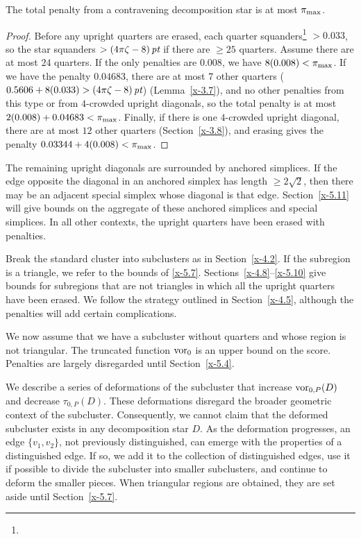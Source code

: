 \begin{lemma}
The total penalty from a contravening decomposition star is at
most $\pi_{\max}$.
\end{lemma}

\begin{proof}
Before any upright quarters are erased, each quarter
squanders\footnote{} %
$>0.033$, so the star squanders $>(4\pi\zeta-8)\,\hbox{\it pt}$ if there
are $\ge25$ quarters.  Assume there are at most $24$ quarters. If
the only penalties are $0.008$, we have $8(0.008)<\pi_{\max}$. If we
have the penalty $0.04683$, there are at most $7$ other quarters
($0.5606+8(0.033)>(4\pi\zeta-8)\,\hbox{\it pt}$) (Lemma~\ref{x-3.7}), and no other
penalties from this type or from $4$-crowded upright diagonals, so
the total penalty is at most $2(0.008)+ 0.04683 < \pi_{\max}$.
Finally, if there is one $4$-crowded upright diagonal, there are
at most $12$ other quarters (Section~\ref{x-3.8}), and erasing
gives the penalty $0.03344+4 (0.008)<\pi_{\max}$.
\end{proof}

The remaining upright diagonals are surrounded by anchored simplices. If
the edge opposite the diagonal in an anchored simplex has length
$\ge2\sqrt2$, then there may be an adjacent special simplex whose
diagonal is that edge.  Section~\ref{x-5.11} will give bounds on the
aggregate of these anchored simplices and special simplices.  In all
other contexts, the upright quarters have been erased with penalties.

Break the standard cluster into subclusters as in Section~\ref{x-4.2}.
If the subregion is a triangle, we refer to the bounds of \ref{x-5.7}.
Sections~\ref{x-4.8}--\ref{x-5.10} give bounds for subregions that are
not triangles in which all the upright quarters have been erased. We
follow the strategy outlined in Section~\ref{x-4.5}, although the
penalties will add certain complications.

We now assume that we have a subcluster without quarters and whose
region is not triangular.  The truncated function $\operatorname{vor}_0$ is an
upper bound on the score.  Penalties are largely disregarded until
Section~\ref{x-5.4}.

We describe a series of deformations of the subcluster that
increase $\operatorname{vor}_{0,P}(D)$ and decrease $\tau_{0,P}(D)$.  These
deformations disregard the broader geometric context of the
subcluster. Consequently, we cannot claim that the deformed
subcluster exists in any decomposition star $D$.  As the
deformation progresses, an edge $\{v_1,v_2\}$, not previously
distinguished, can emerge with the properties of a distinguished
edge. If so, we add it to the collection of distinguished edges,
use it if possible to divide the subcluster into smaller
subclusters, and continue to deform the smaller pieces.  When
triangular regions are obtained, they are set aside until
Section~\ref{x-5.7}.

